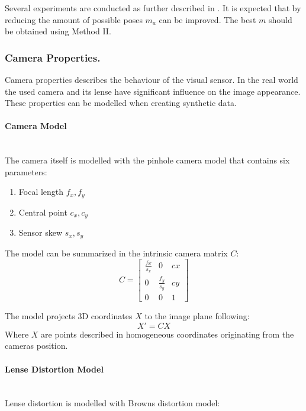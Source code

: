 Several experiments are conducted as further described in . It is expected that by reducing the amount of possible poses $m_a$ can be improved. The best $m$ should be obtained using Method II.

\subsubsection{Camera Properties.}

Camera properties describes the behaviour of the visual sensor. In the real world the used camera and its lense have significant influence on the image appearance. These properties can be modelled when creating synthetic data.

\paragraph{Camera Model}

\hfill \\
The camera itself is modelled with the pinhole camera model that contains six parameters:

\begin{enumerate}
	\item Focal length $f_x,f_y$
	\item Central point $c_x,c_y$
	\item Sensor skew $s_x, s_y$
\end{enumerate}

The model can be summarized in the intrinsic camera matrix $C$:
\begin{equation}
	C = \begin{bmatrix}
	\frac{fx}{s_x} & 0 &cx \\
	0&  \frac{f_y}{s_y}&cy \\
	0& 	0&	1
	\end{bmatrix}
	\label{eq:pinhole1}
\end{equation}

The model projects 3D coordinates $X$ to the image plane following:
\begin{equation}
	X' = C X
	\label{eq:pinhole2}
\end{equation}
Where $X$ are points described in homogeneous coordinates originating from the cameras position.

\paragraph{Lense Distortion Model}\hfill \\
Lense distortion is modelled with Browns distortion model:

